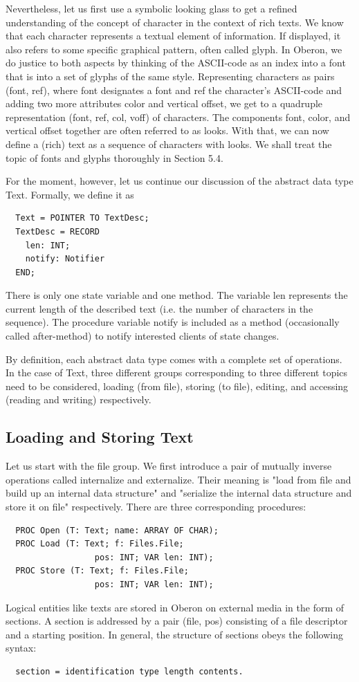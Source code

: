 Nevertheless, let us first use a symbolic looking glass to get a refined understanding of the concept
of character in the context of rich texts. We know that each character represents a textual element
of information. If displayed, it also refers to some specific graphical pattern, often called glyph. In
Oberon, we do justice to both aspects by thinking of the ASCII-code as an index into a font that is
into a set of glyphs of the same style. Representing characters as pairs (font, ref), where font
designates a font and ref the character's ASCII-code and adding two more attributes color and
vertical offset, we get to a quadruple representation (font, ref, col, voff) of characters. The
components font, color, and vertical offset together are often referred to as looks. With that, we can
now define a (rich) text as a sequence of characters with looks. We shall treat the topic of fonts and
glyphs thoroughly in Section 5.4.

For the moment, however, let us continue our discussion of the abstract data type Text. Formally,
we define it as
\begin{verbatim}
  Text = POINTER TO TextDesc;
  TextDesc = RECORD
    len: INT;
    notify: Notifier
  END;
\end{verbatim}
There is only one state variable and one method. The variable len represents the current length of
the described text (i.e. the number of characters in the sequence). The procedure variable notify is
included as a method (occasionally called after-method) to notify interested clients of state
changes.

By definition, each abstract data type comes with a complete set of operations. In the case of Text,
three different groups corresponding to three different topics need to be considered, loading (from
file), storing (to file), editing, and accessing (reading and writing) respectively.

\subsection{Loading and Storing Text}
Let us start with the file group. We first introduce a pair of mutually inverse operations called
internalize and externalize. Their meaning is "load from file and build up an internal data structure"
and "serialize the internal data structure and store it on file" respectively. There are three
corresponding procedures:
\begin{verbatim}
  PROC Open (T: Text; name: ARRAY OF CHAR);
  PROC Load (T: Text; f: Files.File;
                  pos: INT; VAR len: INT);
  PROC Store (T: Text; f: Files.File;
                  pos: INT; VAR len: INT);
\end{verbatim}
Logical entities like texts are stored in Oberon on external media in the form of sections. A section
is addressed by a pair (file, pos) consisting of a file descriptor and a starting position. In general, the
structure of sections obeys the following syntax:
\begin{verbatim}
  section = identification type length contents.
\end{verbatim}

